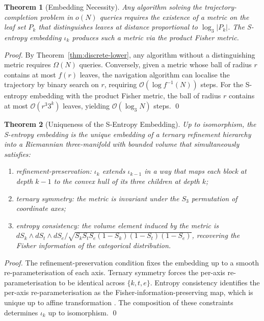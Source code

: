 \documentclass[twocolumn,a4paper]{article}
\newtheorem{theorem}{Theorem}[section]
\begin{document}
\begin{theorem}[Embedding Necessity]
\label{thm:embedding-necessity}
Any algorithm solving the trajectory-completion problem in $o(N)$ queries requires the existence of a metric on the leaf set $P_{k}$ that distinguishes leaves at distance proportional to $\log_{3}|P_{k}|$. The S-entropy embedding $\iota_{k}$ produces such a metric via the product Fisher metric.
\end{theorem}

\begin{proof}
By Theorem~\ref{thm:discrete-lower}, any algorithm without a distinguishing metric requires $\Omega(N)$ queries. Conversely, given a metric whose ball of radius $r$ contains at most $f(r)$ leaves, the navigation algorithm can localise the trajectory by binary search on $r$, requiring $\mathcal{O}(\log f^{-1}(N))$ steps. For the S-entropy embedding with the product Fisher metric, the ball of radius $r$ contains at most $\mathcal{O}(r^{3}3^{k})$ leaves, yielding $\mathcal{O}(\log_{3}N)$ steps. \qed
\end{proof}

\begin{theorem}[Uniqueness of the S-Entropy Embedding]
\label{thm:s-uniqueness}
Up to isomorphism, the S-entropy embedding is the unique embedding of a ternary refinement hierarchy into a Riemannian three-manifold with bounded volume that simultaneously satisfies:
\begin{enumerate}[nosep,label=(\roman*)]
\item refinement-preservation: $\iota_{k}$ extends $\iota_{k-1}$ in a way that maps each block at depth $k-1$ to the convex hull of its three children at depth $k$;
\item ternary symmetry: the metric is invariant under the $S_{3}$ permutation of coordinate axes;
\item entropy consistency: the volume element induced by the metric is $dS_{k}\wedge dS_{t}\wedge dS_{e}/\sqrt{S_{k}S_{t}S_{e}(1-S_{k})(1-S_{t})(1-S_{e})}$, recovering the Fisher information of the categorical distribution.
\end{enumerate}
\end{theorem}

\begin{proof}
The refinement-preservation condition fixes the embedding up to a smooth re-parameterisation of each axis. Ternary symmetry forces the per-axis re-parameterisation to be identical across $\{k,t,e\}$. Entropy consistency identifies the per-axis re-parameterisation as the Fisher-information-preserving map, which is unique up to affine transformation \citep{amari2016information,cencov2000statistical}. The composition of these constraints determines $\iota_{k}$ up to isomorphism. \qed
\end{proof}
\end{document}
